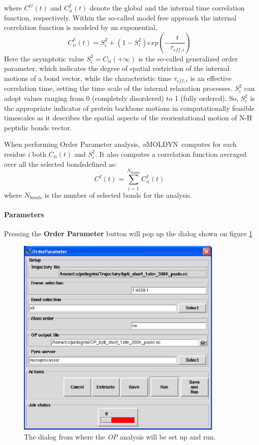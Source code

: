 \documentclass[a4paper,11pt]{report}
\newcommand{\NMOLDYN}{\textit{n}MOLDYN}
\begin{document}
where $C^G(t)$ and $C^I_{ii}(t)$ denote the global and the internal time correlation function, respectively. Within
the so-called model free approach \cite{Szabo:1982,Szabo:1982bis} the internal correlation function is modeled by an 
exponential, 
\begin{equation}
C^I_{ii}(t) = S^2_i +(1 - S^2_i)exp\left(-\frac{t}{\tau_{eff,i}}\right)
\end{equation}
Here the asymptotic value $S^2_i =C_{ii}(+\infty)$ is the so-called generalized order parameter, which indicates the 
degree of spatial restriction of the internal motions of a bond vector, while the characteristic time $\tau_{eff,i}$ is an 
effective correlation time, setting the time scale of the internal relaxation processes. $S^2_i$ can adopt values ranging from 
0 (completely disordered) to 1 (fully ordered). So, $S^2_i$ is the appropriate indicator of protein backbone motions in 
computationally feasible timescales as it describes the spatial aspects of the reorientational motion of N-H peptidic 
bonds vector.

When performing Order Parameter analysis, \NMOLDYN\ computes for each residue \textit{i} both $C_{ii}(t)$ and $S^2_i$. 
It also computes a correlation function averaged over all the selected bondsdefined as:
\begin{equation}
\label{eq:op_cii_avg}
C^I(t) = \sum_{i = 1}^{N_{bonds}} C^I_{ii}(t)
\end{equation}
where $N_{bonds}$ is the number of selected bonds for the analysis.

\paragraph{Parameters\\}
\label{op_parameters}
Pressing the \textbf{Order Parameter} button will pop up the dialog shown on figure \ref{fig:op}
\begin{figure}[h!]
\begin{center}
\includegraphics[width=10cm]{Figures/op.eps}
\end{center}
\caption[The \textit{OP} analysis dialog]{The dialog from where the \textit{OP} analysis will be set up and run.}
\label{fig:op}
\end{figure}   
\end{document}
